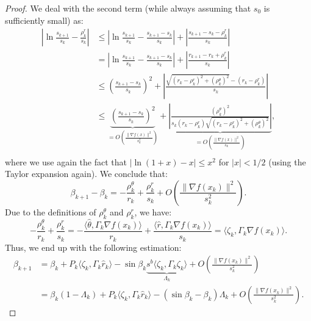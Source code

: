 \documentclass[10pt,a4paper]{amsart}
\newcommand{\innp}[2]{\langle #1, #2 \rangle}
\begin{document}
\begin{proof}
    We deal with the second term (while always assuming that $s_0$ is sufficiently small) as:
    \begin{equation*}
        \begin{aligned}
            \left|\ln \frac{s_{k + 1}}{s_k} - \frac{\rho_k^r}{s_k} \right|&\leq \left|\ln \frac{s_{k + 1}}{s_k} - \frac{s_{k + 1} - s_k}{s_k} \right| + \left|\frac{s_{k + 1} - s_k - \rho^r_k}{s_k}\right|\\
            &= \left|\ln \frac{s_{k + 1}}{s_k} - \frac{s_{k + 1} - s_k}{s_k} \right| + \left|\frac{r_{k + 1} - r_k + \rho^r_k}{s_k}\right|\\
            &\leq \left(\frac{s_{k + 1} - s_k}{s_k}\right)^2 + \left|\frac{\sqrt{(r_k - \rho_k^r)^2 + (\rho_k^\theta)^2} - (r_k - \rho^r_k)}{s_k}\right|\\
            &\leq \underbrace{\left(\frac{s_{k + 1} - s_k}{s_k}\right)^2}_{=O\left(\frac{\|\nabla f(x)\|^2}{s_k^2}\right)} + \underbrace{\left|\frac{(\rho_k^\theta)^2}{s_k(r_k - \rho^r_k)\sqrt{(r_k - \rho_k^r)^2 + (\rho_k^\theta)^2}}\right|}_{=O\left(\frac{\|\nabla f(x)\|^2}{s_k}\right)},\\
        \end{aligned}
    \end{equation*}
    where we use again the fact that $|\ln(1 + x) - x| \leq x^2$ for $|x| < 1/2$ (using the Taylor expansion again). We conclude that:
    \begin{equation*}
        \beta_{k + 1} - \beta_k = -\frac{\rho_k^\theta}{r_k} + \frac{\rho_k^r}{s_k} + O\left(\frac{\|\nabla f(x_k)\|^2}{s_k^2}\right).
    \end{equation*}
    Due to the definitions of $\rho_k^\theta$ and $\rho_k^r$, we have:
    \begin{equation*}
        -\frac{\rho_k^\theta}{r_k} + \frac{\rho_k^r}{s_k} = -\frac{\innp{\hat{\theta}}{\Gamma_k\nabla f(x_k)}}{r_k} + \frac{\innp{\hat{r}}{\Gamma_k\nabla f(x_k)}}{s_k} = \innp{\zeta_k}{\Gamma_k\nabla f(x_k)}.
    \end{equation*}
    Thus, we end up with the following estimation:
    \begin{equation*}
        \begin{aligned}
            \beta_{k + 1} &= \beta_k + P_k\innp{\zeta_k}{\Gamma_k\hat{r}_k} - \sin \beta_k \underbrace{s^b\innp{\zeta_k}{\Gamma_k\zeta_k}}_{\Lambda_k} + O\left(\frac{\|\nabla f(x_k)\|^2}{s_k^2}\right)\\
            &=\beta_k (1 - \Lambda_k) + P_k\innp{\zeta_k}{\Gamma_k\hat{r}_k} - (\sin \beta_k - \beta_k)\Lambda_k + O\left(\frac{\|\nabla f(x_k)\|^2}{s_k^2}\right).

\end{aligned}
\end{equation*}
\end{proof}
\end{document}
